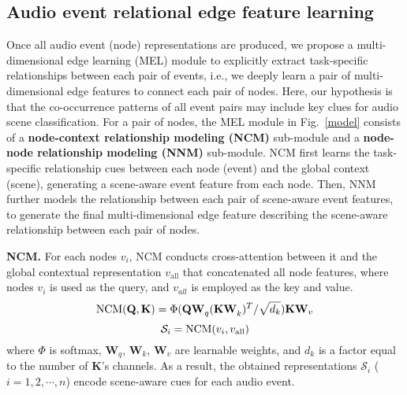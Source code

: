 \documentclass{article}
\begin{document}
\vspace{-0.4cm}
\subsection{Audio event relational edge feature learning}

\vspace{-0.2cm}
Once all audio event (node) representations are produced, we propose a multi-dimensional edge learning (MEL) module to explicitly extract task-specific relationships between each pair of events, i.e., we deeply learn a pair of multi-dimensional edge features to connect each pair of nodes. Here, our hypothesis is that the co-occurrence patterns of all event pairs may include key clues for audio scene classification. For a pair of nodes, the MEL module in Fig.~\ref{model} consists of a \textbf{node-context relationship modeling (NCM)} sub-module and a \textbf{node-node relationship modeling (NNM)} sub-module. NCM first learns the task-specific relationship cues between each node (event) and the global context (scene), generating a scene-aware event feature from each node. Then, NNM further models the relationship between each pair of scene-aware event features, to generate the final multi-dimensional edge feature describing the scene-aware relationship between each pair of nodes.

 


















\textbf{NCM.} For each nodes $v_i$, NCM conducts cross-attention \cite{Transformer} between it and the global contextual representation $v_{\text{all}}$ that concatenated all node features, where nodes $v_i$ is used as the query, and $v_{all}$ is employed as the key and value.
\begin{equation}
\setlength{\abovedisplayskip}{1pt}
\setlength{\belowdisplayskip}{1pt} 
\text{NCM}(\mathbf{Q, K} )=\Phi(\mathbf{{QW}}_q\mathbf{(KW}_k)^T/\sqrt{d_{k}})\mathbf{KW}_v 
\label{self-attention}
\end{equation} 
\begin{equation}
\setlength{\abovedisplayskip}{1pt}
\setlength{\belowdisplayskip}{1pt} 
\mathcal{S}_{i}=\text{NCM}(v_i, v_{\text{all}})
\end{equation} 
where $\Phi$ is softmax, $\mathbf{W}_q$, $\mathbf{W}_k$, $\mathbf{W}_v$ are learnable weights, and $d_k$ is a factor equal to the number of $\mathbf{K}$'s channels. As a result, the obtained representations $\mathcal{S}_{i}$ ($i = 1, 2, \cdots, n$) encode scene-aware cues for each audio event.
\end{document}
